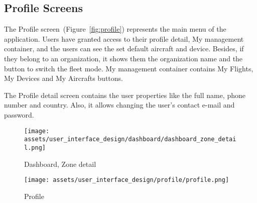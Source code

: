 \subsection{Profile Screens}\label{subsec:profile-screens}
The Profile screen~(Figure~\ref{fig:profile}) represents the main menu of the application.
Users have granted access to their profile detail, My management container, and the users can see the set default aircraft and device.
Besides, if they belong to an organization, it shows them the organization name and the button to switch the fleet mode.
My management container contains My Flights, My Devices and My Aircrafts buttons.

The Profile detail screen contains the user properties like the full name, phone number and country.
Also, it allows changing the user's contact e-mail and password.


\begin{figure}
    \centering
    \begin{minipage}{.4\textwidth}
        \centering
        \texttt{[image: assets/user\_interface\_design/dashboard/dashboard\_zone\_detail.png]}
        \caption{Dashboard, Zone detail}
        \label{fig:dashboard_zone_detail}
    \end{minipage}%
    \hspace{.05\linewidth}
    \begin{minipage}{.4\textwidth}
        \centering
        \texttt{[image: assets/user\_interface\_design/profile/profile.png]}
        \caption{Profile}
        \label{fig:profile}
    \end{minipage}
    \label{fig:profile_all}
\end{figure}
